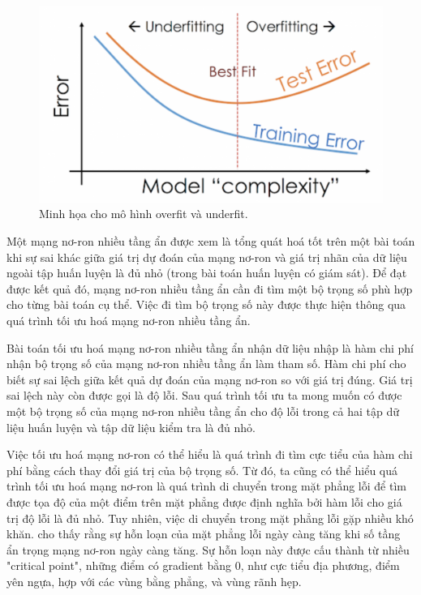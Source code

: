 \begin{figure}[htp]
\centering
\includegraphics[width=100 mm]{images/under-over.png}
\caption{Minh họa cho mô hình overfit và underfit.}
\label{fig:under-over}
\end{figure}

Một mạng nơ-ron nhiều tầng ẩn được xem là tổng quát hoá tốt trên một bài toán khi sự sai khác giữa giá trị dự đoán của mạng nơ-ron và giá trị nhãn của dữ liệu ngoài tập huấn luyện là đủ nhỏ (trong bài toán huấn luyện có giám sát). Để đạt được kết quả đó, mạng nơ-ron nhiều tầng ẩn cần đi tìm một bộ trọng số phù hợp cho từng bài toán cụ thể. Việc đi tìm bộ trọng số này được thực hiện thông qua quá trình tối ưu hoá mạng nơ-ron nhiều tầng ẩn.

Bài toán tối ưu hoá mạng nơ-ron nhiều tầng ẩn nhận dữ liệu nhập là hàm chi phí nhận bộ trọng số của mạng nơ-ron nhiều tầng ẩn làm tham số. Hàm chi phí cho biết sự sai lệch giữa kết quả dự đoán của mạng nơ-ron so với giá trị đúng. Giá trị sai lệch này còn được gọi là độ lỗi. Sau quá trình tối ưu ta mong muốn có được một bộ trọng số của mạng nơ-ron nhiều tầng ẩn cho độ lỗi trong cả hai tập dữ liệu huấn luyện và tập dữ liệu kiểm tra là đủ nhỏ.

Việc tối ưu hoá mạng nơ-ron có thể hiểu là quá trình đi tìm cực tiểu của hàm chi phí bằng cách thay đổi giá trị của bộ trọng số. Từ đó, ta cũng có thể hiểu quá trình tối ưu hoá mạng nơ-ron là quá trình di chuyển trong mặt phẳng lỗi để tìm được tọa độ của một điểm trên mặt phẳng được định nghĩa bởi hàm lỗi cho giá trị độ lỗi là đủ nhỏ. Tuy nhiên, việc di chuyển trong mặt phẳng lỗi gặp nhiều khó khăn. \parencite{li2018visualizing} cho thấy rằng sự hỗn loạn của mặt phẳng lỗi ngày càng tăng khi số tầng ẩn trọng mạng nơ-ron ngày càng tăng. Sự hỗn loạn này được cấu thành từ nhiều "critical point", những điểm có gradient bằng 0, như cực tiểu địa phương, điểm yên ngựa, hợp với các vùng bằng phẳng, và vùng rãnh hẹp. 

